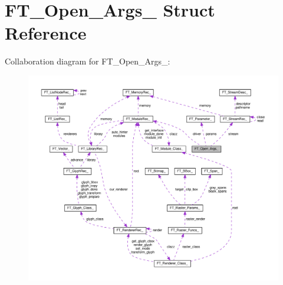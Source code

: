 \hypertarget{structFT__Open__Args__}{}\section{F\+T\+\_\+\+Open\+\_\+\+Args\+\_\+ Struct Reference}
\label{structFT__Open__Args__}


Collaboration diagram for F\+T\+\_\+\+Open\+\_\+\+Args\+\_\+\+:
\nopagebreak
\begin{figure}[H]
\begin{center}
\leavevmode
\includegraphics[width=350pt]{structFT__Open__Args____coll__graph}
\end{center}
\end{figure}
